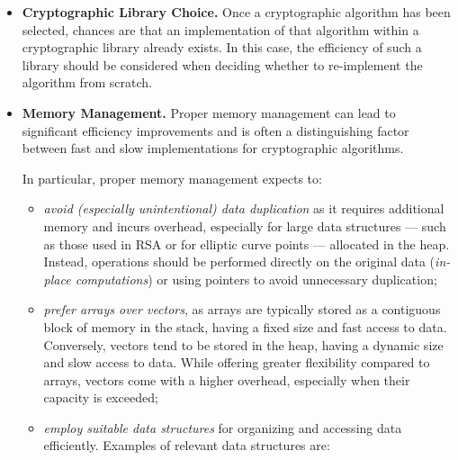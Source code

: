 \begin{itemize}
	We remark that, in practice, a hybrid approach is often employed to achieve the benefits of both types of encryption. 
	
	\item \textbf{Cryptographic Library Choice.} Once a cryptographic algorithm has been selected, chances are that an implementation of that algorithm within a cryptographic library already exists. In this case, the efficiency of such a library should be considered when deciding whether to re-implement the algorithm from scratch.
	
	\item \textbf{Memory Management.} Proper memory management can lead to significant efficiency improvements and is often a distinguishing factor between fast and slow implementations for cryptographic algorithms.
	
	
	In particular, proper memory management expects to:
	
	\begin{itemize} 
		
		\item \textit{avoid (especially unintentional) data duplication} as it requires additional memory and incurs overhead, especially for large data structures --- such as those used in RSA or for elliptic curve points --- allocated in the heap. Instead, operations should be performed directly on the original data (\textit{in-place computations}) or using pointers to avoid unnecessary duplication;
		
		\item \textit{prefer arrays over vectors}, as arrays are typically stored as a contiguous block of memory in the stack, having a fixed size and fast access to data. Conversely, vectors tend to be stored in the heap, having a dynamic size and slow access to data. While offering greater flexibility compared to arrays, vectors come with a higher overhead, especially when their capacity is exceeded;
		
		\item \textit{employ suitable data structures} for organizing and accessing data efficiently. Examples of relevant data structures are:
		
		\begin{itemize} 
			

\end{itemize}
\end{itemize}
\end{itemize}
